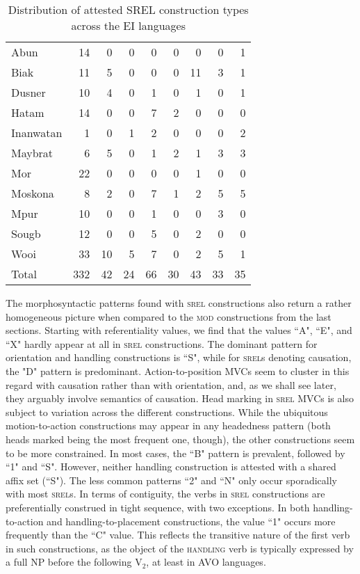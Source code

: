 \begin{table}
\begin{tabular}{l r r r r r r r r}
  Abun &  14 &   0 &   0 &   0 &   0 &   0 &   0 &   1 \\ 
  Biak &  11 &   5 &   0 &  0 &   0 &   11 &   3 &   1 \\ 
  Dusner &  10 &   4 &   0 &   1 &   0 &   1 &   0 &   1 \\ 
  Hatam &  14 &   0 &   0 &   7 &   2 &   0 &   0 &   0 \\ 
  Inanwatan &   1 &   0 &   1 &   2 &   0 &   0 &   0 &   2 \\ 
  Maybrat &   6 &   5 &   0 &   1 &   2 &   1 &   3 &   3 \\ 
  Mor &  22 &   0 &   0 &   0 &   0 &   1 &   0 &   0 \\ 
  Moskona &   8 &   2 &   0 &   7 &   1 &   2 &   5 &   5 \\ 
  Mpur &  10 &   0 &   0 &   1 &   0 &   0 &   3 &   0 \\ 
  Sougb &  12 &   0 &   0 &   5 &   0 &   2 &   0 &   0 \\ 
  Wooi &  33 &  10 &   5 &   7 &   0 &   2 &   5 &   1 \\ 
   \hline
      Total & 332 & 42 & 24 & 66 & 30 & 43 & 33 & 35 \\
   \hline
\end{tabular}
\caption{Distribution of attested SREL construction types across the EI languages}
\label{table:srel-language}


\end{table}


The morphosyntactic patterns found with \textsc{srel} constructions also return a rather homogeneous picture when compared to the \textsc{mod} constructions from the last sections. Starting with referentiality values, we find that the values ``A", ``E", and ``X" hardly appear at all in \textsc{srel} constructions. The dominant pattern for orientation and handling constructions is ``S", while for \textsc{srel}s denoting causation, the "D" pattern is predominant. Action-to-position MVCs seem to cluster in this regard with causation rather than with orientation, and, as we shall see later, they arguably involve semantics of causation. Head marking in \textsc{srel} MVCs is also subject to variation across the different constructions. While the ubiquitous motion-to-action constructions may appear in any headedness pattern (both heads marked being the most frequent one, though), the other constructions seem to be more constrained. In most cases, the ``B" pattern is prevalent, followed by ``1" and ``S". However, neither handling construction is attested with a shared affix set (``S"). The less common patterns ``2" and ``N" only occur sporadically with most \textsc{srel}s. In terms of contiguity, the verbs in \textsc{srel} constructions are preferentially construed in tight sequence, with two exceptions. In both handling-to-action and handling-to-placement constructions, the value ``1" occurs more frequently than the ``C" value. This reflects the transitive nature of the first verb in such constructions, as the object of the \textsc{handling} verb is typically expressed by a full NP before the following V$_2$, at least in AVO languages.

